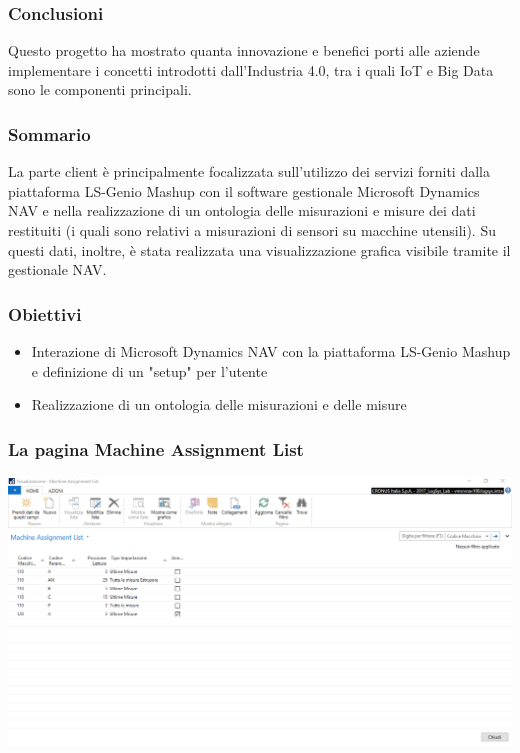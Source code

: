 \documentclass{beamer}
\begin{document}
\begin{frame}
	\frametitle{Conclusioni}
	Questo progetto ha mostrato quanta innovazione e benefici porti alle aziende implementare i concetti introdotti dall’Industria 4.0, tra i quali IoT e Big Data sono le componenti principali.
\end{frame}

\begin{frame}
\frametitle{Sommario}
La parte client è principalmente focalizzata sull’utilizzo dei servizi forniti dalla piattaforma LS-Genio Mashup con il software gestionale Microsoft Dynamics NAV e nella realizzazione di un ontologia delle misurazioni e misure dei dati restituiti (i quali sono relativi a misurazioni di sensori su macchine utensili). Su questi dati, inoltre, è stata realizzata una visualizzazione grafica visibile tramite il gestionale NAV.
\end{frame}

\begin{frame}
\frametitle{Obiettivi}
\begin{itemize}
	\item Interazione di Microsoft Dynamics NAV con la piattaforma LS-Genio Mashup e definizione di un "setup" per l'utente
	
	\item Realizzazione di un ontologia delle misurazioni e delle misure
\end{itemize}	
\end{frame}

\begin{frame}
\frametitle{La pagina Machine Assignment List}
\includegraphics[width=1\textwidth]{images/MachineAssignmentList2.png}
\end{frame}
\end{document}
